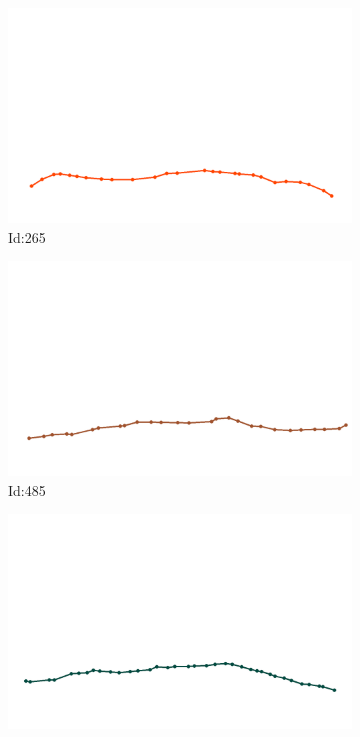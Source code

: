 \documentclass[12pt,twoside]{report}
\begin{document}
\begin{figure}
\centering
\begin{subfigure}[b]{0.20\textwidth}
\centering
\includegraphics[width=\textwidth]{../../trajectories/265.png}
\caption{Id:265}
\end{subfigure}
\begin{subfigure}[b]{0.20\textwidth}
\centering
\includegraphics[width=\textwidth]{../../trajectories/485.png}
\caption{Id:485}
\end{subfigure}
\begin{subfigure}[b]{0.20\textwidth}
\centering
\includegraphics[width=\textwidth]{../../trajectories/783.png}

\end{subfigure}
\end{figure}
\end{document}
